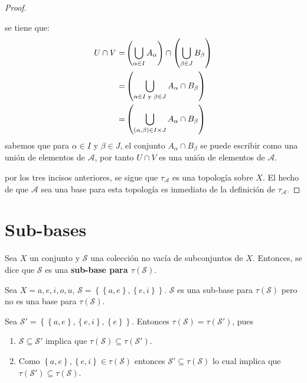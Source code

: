 \documentclass[12pt]{report}
\theoremstyle{largebreak}
\begin{document}
\begin{proof}
\begin{enumerate}
            se tiene que:
            \begin{equation*}
                \begin{split}
                    U\cap V =& \left(\bigcup_{\alpha\in I}A_\alpha\right) \cap \left(\bigcup_{\beta\in J}B_\beta\right)\\
                    =& \left(\bigcup_{\alpha\in I\textup{ y }\beta\in J}A_\alpha\cap B_\beta\right)\\
                    =& \left(\bigcup_{(\alpha,\beta)\in I\times J}A_\alpha\cap B_\beta\right)\\
                \end{split}
            \end{equation*}
            sabemos que para $\alpha\in I$ y $\beta\in J$, el conjunto $A_\alpha\cap B_\beta$ se puede escribir como una unión de elementos de $\mathcal{A}$, por tanto $U\cap V$ es una unión de elementos de $\mathcal{A}$.
        \end{enumerate}
        por los tres incisos anteriores, se sigue que $\tau_{\mathcal{A}}$ es una topología sobre $X$. El hecho de que $\mathcal{A}$ sea una base para esta topología es inmediato de la definición de $\tau_{\mathcal{A}}$.
    \end{proof}

    \section{Sub-bases}

    \begin{mydef}
        Sea $X$ un conjunto y $\mathcal{S}$ una colección no vacía de subconjuntos de $X$. Entonces, se dice que $\mathcal{S}$ es una \textbf{sub-base para $\tau(\mathcal{S})$}.
    \end{mydef}

    \begin{exa}
        Sea $X={a,e,i,o,u}$, $\mathcal{S}=\left\{\left\{a,e\right\},\left\{e,i\right\} \right\}$. $\mathcal{S}$ es una sub-base para $\tau(\mathcal{S})$ pero no es una base para $\tau(\mathcal{S})$.

        Sea $\mathcal{S}'=\left\{\left\{a,e\right\},\left\{e,i\right\},\left\{e\right\} \right\}$. Entonces $\tau(\mathcal{S})=\tau(\mathcal{S}')$, pues 
        \begin{enumerate}
            \item $\mathcal{S}\subseteq\mathcal{S}'$ implica que $\tau(\mathcal{S})\subseteq\tau(\mathcal{S}')$.
            \item Como $\left\{a,e\right\},\left\{e,i\right\}\in\tau(\mathcal{S})$ entonces $\mathcal{S}'\subseteq\tau(\mathcal{S})$ lo cual implica que $\tau(\mathcal{S}')\subseteq\tau(\mathcal{S})$.
        \end{enumerate}
    \end{exa}
\end{document}
